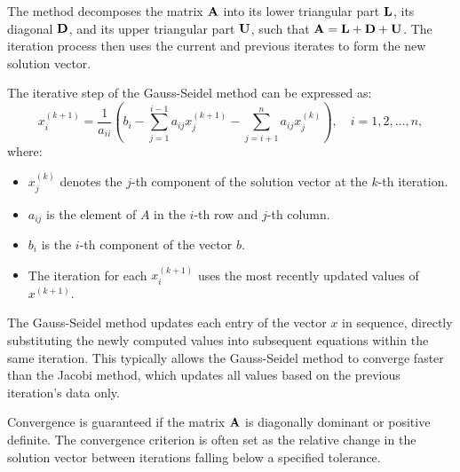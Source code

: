 
The method decomposes the matrix $\mathbf{A}$ into its lower triangular part $\mathbf{L}$, its diagonal $\mathbf{D}$, and its upper triangular part $\mathbf{U}$, 
such that $\mathbf{A} = \mathbf{L} + \mathbf{D} + \mathbf{U}$. The iteration process then uses the current and previous iterates to form the new solution vector.

The iterative step of the Gauss-Seidel method can be expressed as:
\begin{equation*}
    x^{(k+1)}_i = \frac{1}{a_{ii}}\left(b_i - \sum_{j=1}^{i-1} a_{ij} x^{(k+1)}_j - \sum_{j=i+1}^n a_{ij} x^{(k)}_j \right), \quad i = 1, 2, \ldots, n,
\end{equation*}
where:
\begin{itemize}
    \item $x^{(k)}_j$ denotes the $j$-th component of the solution vector at the $k$-th iteration.
    \item $a_{ij}$ is the element of $A$ in the $i$-th row and $j$-th column.
    \item $b_i$ is the $i$-th component of the vector $b$.
    \item The iteration for each $x^{(k+1)}_i$ uses the most recently updated values of $x^{(k+1)}$.
\end{itemize}

The Gauss-Seidel method updates each entry of the vector $x$ in sequence, directly substituting the newly computed values into subsequent equations within the same iteration. This typically allows the Gauss-Seidel method to converge faster than the Jacobi method, which updates all values based on the previous iteration's data only.

Convergence is guaranteed if the matrix $\mathbf{A}$ is diagonally dominant or positive definite. 
The convergence criterion is often set as the relative change in the solution vector between iterations falling below a specified tolerance.
